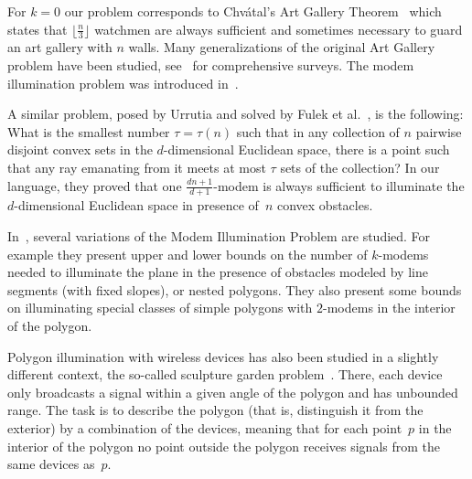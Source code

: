 \documentclass[A4]{article}
\begin{document}
For $k=0$ our problem corresponds to Chv\'atal's Art Gallery Theorem~\cite{Chvatal} which states that $\big\lfloor\frac{n}{3}\big\rfloor$ watchmen are always sufficient and sometimes necessary to guard an art gallery with $n$ walls.
Many generalizations of the original Art Gallery problem have been studied, see~\cite{ORourke,Shermer,Urrutia} for comprehensive surveys.
The modem illumination problem was introduced in~\cite{Aich,Ruy}.

A similar problem, posed by Urrutia and solved by Fulek et al.~\cite{Pach}, is the following:
What is the smallest number $\tau = \tau (n)$ such that in any collection of $n$ pairwise disjoint convex sets in the $d$-dimensional Euclidean space, there is a point such that any ray emanating from it meets at most $\tau$ sets of the collection?
In our language, they proved that one \mbox{$\frac{dn+1}{d+1}$-modem} is always sufficient to illuminate the $d$-dimensional Euclidean space in presence of~$n$ convex obstacles.

In~\cite{Ball}, several variations of the Modem Illumination Problem are studied.
For example they present upper and lower bounds on the number of \mbox{$k$-modems} needed to illuminate the plane in the presence of obstacles modeled by line segments (with fixed slopes), or nested polygons.
They also present some bounds on illuminating special classes of simple polygons with \mbox{$2$-modems} in the interior of the polygon.

Polygon illumination with wireless devices has also been studied in a slightly different context,  the so-called sculpture garden problem~\cite{EGS,CHOU}.  
There, each device only broadcasts a signal within a given angle of the polygon and has unbounded range.
The task is to describe the polygon (that is, distinguish it from the exterior) by a combination of the devices, meaning that for each point~$p$ in the interior of the polygon no point outside the polygon receives signals from the same devices as~$p$. 
\end{document}
